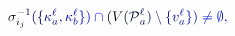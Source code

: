 \documentclass[12pt]{article}
\begin{document}
\makeatletter
\renewcommand*{\@textcolor}[3]{%
  \protect\leavevmode
  \begingroup
    \color#1{#2}#3%
  \endgroup
}
\makeatother
\begin{displaymath}
\mathcolor[RGB]{0,0,15}{\sigma} _ { \mathcolor[RGB]{0,0,30}{i} _ { \mathcolor[RGB]{0,0,45}{j} } } ^ { \mathcolor[RGB]{0,0,60}{-} \mathcolor[RGB]{0,0,75}{1} } \mathcolor[RGB]{0,0,90}{(} \mathcolor[RGB]{0,0,105}{\{} \mathcolor[RGB]{0,0,120}{\kappa} _ { \mathcolor[RGB]{0,0,135}{a} } ^ { \mathcolor[RGB]{0,0,150}{\ell} } \mathcolor[RGB]{0,0,165}{,} \mathcolor[RGB]{0,0,180}{\kappa} _ { \mathcolor[RGB]{0,0,195}{b} } ^ { \mathcolor[RGB]{0,0,210}{\ell} } \mathcolor[RGB]{0,0,225}{\}} \mathcolor[RGB]{0,0,240}{)} \mathcolor[RGB]{0,0,255}{\cap} \mathcolor[RGB]{0,15,0}{(} \mathcolor[RGB]{0,15,15}{V} \mathcolor[RGB]{0,15,30}{(} \mathcal { \mathcolor[RGB]{0,15,45}{P} } _ { \mathcolor[RGB]{0,15,60}{a} } ^ { \mathcolor[RGB]{0,15,75}{\ell} } \mathcolor[RGB]{0,15,90}{)} \mathcolor[RGB]{0,15,105}{\setminus} \mathcolor[RGB]{0,15,120}{\{} \mathcolor[RGB]{0,15,135}{v} _ { \mathcolor[RGB]{0,15,150}{a} } ^ { \mathcolor[RGB]{0,15,165}{\ell} } \mathcolor[RGB]{0,15,180}{\}} \mathcolor[RGB]{0,15,195}{)} \mathcolor[RGB]{0,15,210}{\neq} \mathcolor[RGB]{0,15,225}{\emptyset} \mathcolor[RGB]{0,15,240}{,}
\end{displaymath}
\end{document}
